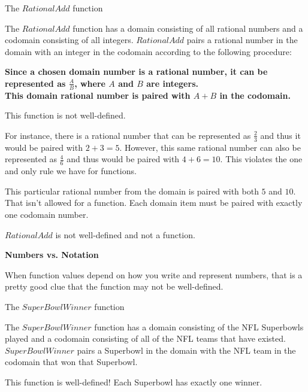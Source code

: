 \documentclass{ximera}
\begin{document}
\begin{example} The $RationalAdd$ function

The $RationalAdd$ function has a domain consisting of all rational numbers and a codomain consisting of all integers.  $RationalAdd$ pairs a rational number in the domain with an integer in the codomain according to the following procedure: 

\begin{center}
\textbf{\textcolor{blue!55!black}{Since a chosen domain number is a rational number, it can be represented as $\tfrac{A}{B}$, where $A$ and $B$ are integers. \\This domain rational number is paired with $A+B$ in the codomain.}}
\end{center}

This function is not well-defined.  

For instance, there is a rational number that can be represented as $\tfrac{2}{3}$ and thus it would be paired with $2 + 3 = 5$.  However, this same rational number can also be represented as $\tfrac{4}{6}$ and thus would be paired with $4 + 6 = 10$.  This violates the one and only rule we have for functions.  


This particular rational number from the domain is paired with both $5$ and $10$. That isn't allowed for a function. Each domain item must be paired with exactly one codomain number. 

$RationalAdd$ is not well-defined and not a function.

\end{example}



\begin{warning} \textbf{\textcolor{red!70!black}{Numbers vs. Notation}}

When function values depend on how you write and represent numbers, that is a pretty good clue that the function may not be well-defined.
\end{warning}


\begin{example} The $SuperBowlWinner$ function  

The $SuperBowlWinner$ function has a domain consisting of the NFL Superbowls played and a codomain consisting of all of the NFL teams that have existed.  $SuperBowlWinner$ pairs a Superbowl in the domain with the NFL team in the codomain that won that Superbowl.  

This function is well-defined! Each Superbowl has exactly one winner.
\end{example}
\end{document}
